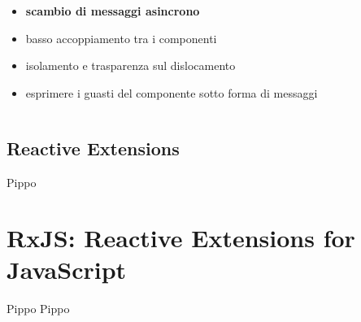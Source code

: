\begin{frame}[c]{\insertsectionhead}{\insertsubsectionhead}
\begin{columns}
\begin{column}{.47\textwidth}
                    \subsubsection{}\label{subsub:meddagedriven}
                    \begin{block}{\insertsubsubsectionhead}
                        \begin{itemize}
                            \item
                                \textbf{scambio di messaggi asincrono}
                            \item
                                basso accoppiamento tra i componenti
                            \item
                                isolamento e trasparenza sul dislocamento
                            \item
                                esprimere i guasti del componente sotto forma di messaggi
                        \end{itemize}
                    \end{block}
                \end{column}
            \end{columns}
        \end{frame}

        \subsection{Reactive Extensions}\label{subsec:rx}
        \begin{frame}{\insertsectionhead}
            \begin{block}{\insertsubsectionhead}
                Pippo
            \end{block}
        \end{frame}

    \section{RxJS: Reactive Extensions for JavaScript}\label{sec:rxjs}
        \begin{frame}{\insertsectionhead}{\insertsubsectionhead}
            \begin{block}{Pippo}
                Pippo
            \end{block}
        \end{frame}
    \nocite{*}
    \section{\refname}\label{sec:ref}
    \begin{frame}[t,allowframebreaks]
        \frametitle{\insertsectionhead}
        \printbibliography
    \end{frame}

